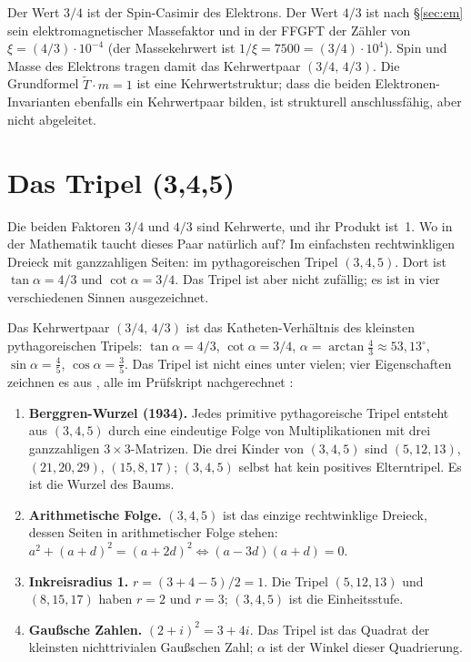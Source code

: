 Der Wert $3/4$ ist der Spin-Casimir des Elektrons. Der Wert $4/3$ ist nach
§\ref{sec:em} sein elektromagnetischer Massefaktor und in der FFGFT der Zähler
von $\xi = (4/3)\cdot10^{-4}$ (der Massekehrwert ist $1/\xi=7500=(3/4)\cdot10^4$). Spin und Masse des Elektrons tragen damit das
Kehrwertpaar $(3/4,\,4/3)$. Die Grundformel $\tilde T\cdot m = 1$ ist eine
Kehrwertstruktur; dass die beiden Elektronen-Invarianten ebenfalls ein
Kehrwertpaar bilden, ist strukturell anschlussfähig, aber nicht abgeleitet.

\section{Das Tripel (3,4,5)}
\label{sec:345}

Die beiden Faktoren $3/4$ und $4/3$ sind Kehrwerte, und ihr Produkt ist~1.
Wo in der Mathematik taucht dieses Paar natürlich auf? Im einfachsten
rechtwinkligen Dreieck mit ganzzahligen Seiten: im pythagoreischen Tripel
$(3,4,5)$. Dort ist $\tan\alpha = 4/3$ und $\cot\alpha = 3/4$. Das Tripel
ist aber nicht zufällig; es ist in vier verschiedenen Sinnen ausgezeichnet.

Das Kehrwertpaar $(3/4,\,4/3)$ ist das Katheten-Verhältnis des kleinsten
pythagoreischen Tripels: $\tan\alpha = 4/3$, $\cot\alpha = 3/4$,
$\alpha = \arctan\tfrac43 \approx 53{,}13^\circ$, $\sin\alpha = \tfrac45$,
$\cos\alpha = \tfrac35$. Das Tripel ist nicht eines unter vielen; vier
Eigenschaften zeichnen es aus \EM, alle im Prüfskript nachgerechnet \BM:

\begin{enumerate}
\item \textbf{Berggren-Wurzel (1934).} Jedes primitive pythagoreische Tripel
  entsteht aus $(3,4,5)$ durch eine eindeutige Folge von Multiplikationen
  mit drei ganzzahligen $3\times3$-Matrizen. Die drei Kinder von $(3,4,5)$
  sind $(5,12,13)$, $(21,20,29)$, $(15,8,17)$; $(3,4,5)$ selbst hat kein
  positives Elterntripel. Es ist die Wurzel des Baums.
\item \textbf{Arithmetische Folge.} $(3,4,5)$ ist das einzige rechtwinklige
  Dreieck, dessen Seiten in arithmetischer Folge stehen:
  $a^2+(a+d)^2=(a+2d)^2 \Leftrightarrow (a-3d)(a+d)=0$.
\item \textbf{Inkreisradius 1.} $r = (3+4-5)/2 = 1$. Die Tripel $(5,12,13)$
  und $(8,15,17)$ haben $r=2$ und $r=3$; $(3,4,5)$ ist die Einheitsstufe.
\item \textbf{Gaußsche Zahlen.} $(2+i)^2 = 3+4i$. Das Tripel ist das Quadrat
  der kleinsten nichttrivialen Gaußschen Zahl; $\alpha$ ist der Winkel dieser
  Quadrierung.
\end{enumerate}

